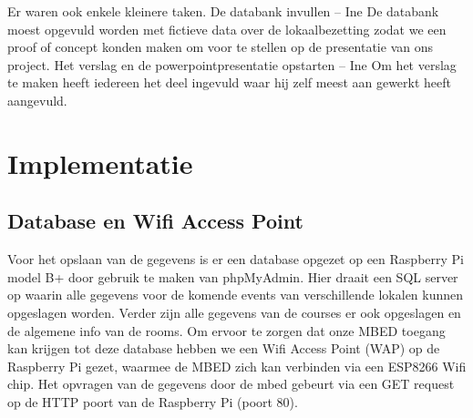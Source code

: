 \documentclass[a4paper,kul]{kulakarticle} %
\begin{document}
\newline
\newline
Er waren ook enkele kleinere taken.
\newline
\newline
De databank invullen – Ine
\newline
De databank moest opgevuld worden met fictieve data over de lokaalbezetting zodat we een proof of concept konden maken om voor te stellen op de presentatie van ons project.
\newline
\newline
Het verslag en de powerpointpresentatie opstarten – Ine 
\newline
Om het verslag te maken heeft iedereen het deel ingevuld waar hij zelf meest aan gewerkt heeft aangevuld. 

\newpage

\section{Implementatie}
\subsection{Database en Wifi Access Point}
Voor het opslaan van de gegevens is er een database opgezet op een Raspberry Pi model B+ door gebruik te maken van phpMyAdmin. Hier draait een SQL server op waarin alle gegevens voor de komende events van verschillende lokalen kunnen opgeslagen worden. Verder zijn alle gegevens van de courses er ook opgeslagen en de algemene info van de rooms. Om ervoor te zorgen dat onze MBED toegang kan krijgen tot deze database hebben we een Wifi Access Point (WAP) op de Raspberry Pi gezet, waarmee de MBED zich kan verbinden via een ESP8266 Wifi chip. Het opvragen van de gegevens door de mbed gebeurt via een GET request op de HTTP poort van de Raspberry Pi (poort 80).
 
\end{document}
